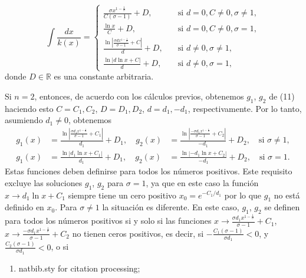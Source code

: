\documentclass[a4paper,fleqn]{cas-dc}
\begin{document}
\begin{equation}
\int\frac{dx}{k\left(x\right)}=
\begin{cases}
\frac{\sigma x^{1-\frac{1}{\sigma}}}{C\left(\sigma-1\right)}+D,\quad&\text{si }d=0,C\neq0,\sigma\neq1,\\
\frac{\ln x}{C}+D,\quad&\text{si }d=0,C\neq0,\sigma=1,\\
\frac{\ln\left|\frac{\sigma dx^{1-\frac{1}{\sigma}}}{\sigma-1}+C\right|}{d}+D,\quad&\text{si }d\neq0,\sigma\neq1,\\
\frac{\ln\left|d\ln x+C\right|}{d}+D,\quad&\text{si }d\neq0,\sigma=1,
\end{cases}
\end{equation}
donde $D\in\mathds{R}$ es una constante arbitraria.

Si $n=2$, entonces, de acuerdo con los cálculos previos, obtenemos $g_{1}$, $g_{2}$ de (11) haciendo esto $C=C_{1},C_{2}$, $D=D_{1},D_{2}$, $d=d_{1},-d_{1}$, respectivamente. Por lo tanto, asumiendo $d_{1}\neq0$, obtenemos
\begin{align*}
g_{1}\left(x\right)
&=\frac{\ln\left|\frac{\sigma d_{1}x^{1-\frac{1}{\sigma}}}{\sigma-1}+C_{1}\right|}{d_{1}}+D_{1},\quad
g_{2}\left(x\right)
&=\frac{\ln\left|\frac{-\sigma d_{1}x^{1-\frac{1}{\sigma}}}{\sigma-1}+C_{2}\right|}{-d_{1}}+D_{2},\quad\text{si }\sigma\neq1,\\
g_{1}\left(x\right)
&=\frac{\ln\left|d_{1}\ln x+C_{1}\right|}{d_{1}}+D_{1},\quad
g_{2}\left(x\right)
&=\frac{\ln\left|-d_{1}\ln x+C_{2}\right|}{-d_{1}}+D_{2},\quad\text{si }\sigma=1.
\end{align*}
Estas funciones deben definirse para todos los números positivos. Este requisito excluye las soluciones $g_{1}$, $g_{2}$ para $\sigma=1$, ya que en este caso la función $x\rightarrow d_{1}\ln x+C_{1}$ siempre tiene un cero positivo $x_{0}=e^{-C_{1}/d_{1}}$ por lo que $g_{1}$ no está definido en $x_{0}$. Para $\sigma\neq1$ la situación es diferente. En este caso, $g_{1}$, $g_{2}$ se definen para todos los números positivos si y solo si las funciones $x\rightarrow\frac{\sigma d_{1}x^{1-\frac{1}{\sigma}}}{\sigma-1}+C_{1}$, $x\rightarrow\frac{-\sigma d_{1}x^{1-\frac{1}{\sigma}}}{\sigma-1}+C_{2}$ no tienen ceros positivos, es decir, si $-\frac{C_{1}\left(\sigma-1\right)}{\sigma d_{1}}<0$, y $\frac{C_{2}\left(\sigma-1\right)}{\sigma d_{1}}<0$, o si
\begin{enumerate}
\itemsep=0pt
\item {natbib.sty} for citation processing;
\end{enumerate}
\end{document}
